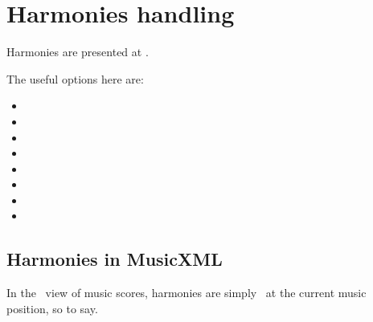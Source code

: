 



\chapter{Harmonies handling}\label{Harmonies handling}

Harmonies are presented at .

The useful options here are:
\begin{itemize}
\item {}
\item {}
\item {}
\item {}
\item {}
\item {}
\item {}
\item {}
\end{itemize}

\section{Harmonies in MusicXML}

In the \mxml\ view of music scores, harmonies are simply \drawn\ at the current music position, so to say.

